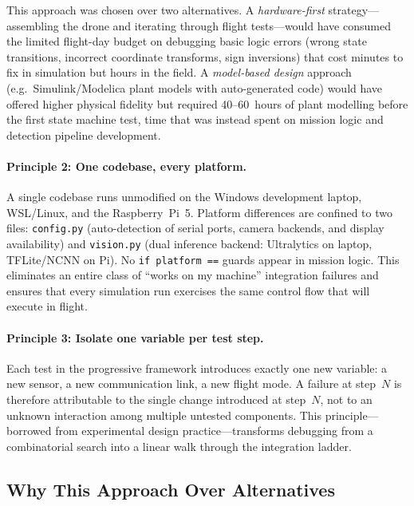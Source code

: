 This approach was chosen over two alternatives.
A \emph{hardware-first} strategy---assembling the drone and iterating through flight tests---would have consumed the limited flight-day budget on debugging basic logic errors (wrong state transitions, incorrect coordinate transforms, sign inversions) that cost minutes to fix in simulation but hours in the field.
A \emph{model-based design} approach (e.g.\ Simulink/Modelica plant models with auto-generated code) would have offered higher physical fidelity but required 40--60~hours of plant modelling before the first state machine test, time that was instead spent on mission logic and detection pipeline development.

\paragraph{Principle 2: One codebase, every platform.}
A single codebase runs unmodified on the Windows development laptop, WSL/Linux, and the Raspberry~Pi~5.
Platform differences are confined to two files: \texttt{config.py} (auto-detection of serial ports, camera backends, and display availability) and \texttt{vision.py} (dual inference backend: Ultralytics on laptop, TFLite/NCNN on Pi).
No \texttt{if platform ==} guards appear in mission logic.
This eliminates an entire class of ``works on my machine'' integration failures and ensures that every simulation run exercises the same control flow that will execute in flight.

\paragraph{Principle 3: Isolate one variable per test step.}
Each test in the progressive framework introduces exactly one new variable: a new sensor, a new communication link, a new flight mode.
A failure at step~$N$ is therefore attributable to the single change introduced at step~$N$, not to an unknown interaction among multiple untested components.
This principle---borrowed from experimental design practice---transforms debugging from a combinatorial search into a linear walk through the integration ladder.

\subsection{Why This Approach Over Alternatives}\label{sec:strategy-alternatives}

